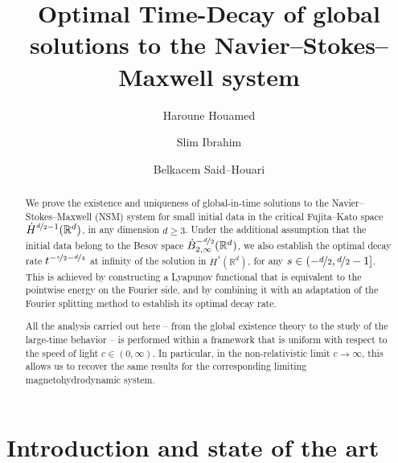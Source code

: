 \documentclass[11pt, leqno, a4paper,]{amsart}
\title[Navier--Stokes--Maxwell]{Optimal Time-Decay of global solutions to the Navier--Stokes--Maxwell system}
\author{Haroune Houamed}
\author{Slim Ibrahim}
\author{Belkacem Said--Houari}
\theoremstyle{remark}
\numberwithin{equation}{section}
\begin{document}
	 
	\begin{abstract}
We prove the existence and uniqueness of global-in-time solutions to the Navier--Stokes--Maxwell (NSM) system for small initial data in the critical Fujita--Kato space $\dot H^{\nicefrac{d}{2}-1}(\mathbb R^d)$, in any dimension $d\geq 3$.   Under the additional assumption that the initial data belong to the Besov space $\dot B^{-\nicefrac{d}{2}}_{2,\infty}(\mathbb R^d)$, we also establish the optimal decay rate $t^{-\nicefrac{s}{2}-\nicefrac{d}{4}}$ at infinity
of the solution in $\dot H^s(\mathbb R^d)$, for any $s\in\left(-\nicefrac{d}{2},\nicefrac{d}{2}-1\right]$. This is achieved by   constructing  a Lyapunov functional that is  equivalent to the pointwise energy  on  the Fourier  side, and by combining it with an adaptation of the Fourier splitting method to establish its optimal decay rate.

All the analysis carried out here -- from the global existence theory to the study of the large-time behavior -- is performed within a framework that is uniform with respect to the speed of light $c\in(0,\infty)$. In particular, in the non-relativistic limit $c\to\infty$, this allows us to recover  the same results   for the corresponding   limiting magnetohydrodynamic   system. 
\end{abstract}



\maketitle



\tableofcontents
\section{Introduction and state of the art}
 
\end{document}
